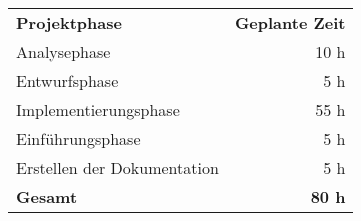 \begin{tabular}{lr}
\rowcolor{heading}\textbf{Projektphase} & \textbf{Geplante Zeit} \\
Analysephase & 10 h \\
\rowcolor{odd}Entwurfsphase & 5 h \\
Implementierungsphase & 55 h \\
\rowcolor{odd}Einführungsphase & 5 h \\Erstellen der Dokumentation & 5 h \\
\hline
\hline
\rowcolor{odd}\textbf{Gesamt} & \textbf{80 h} \\
\end{tabular}
